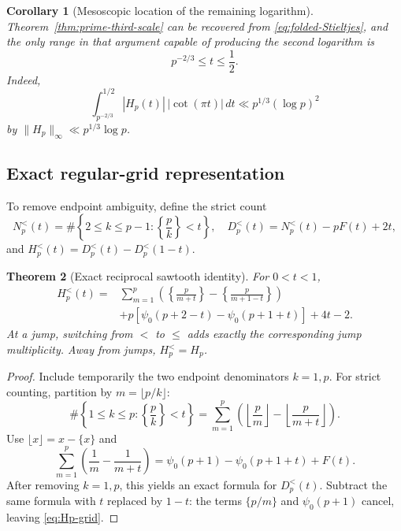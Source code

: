\documentclass[11pt]{amsart}
\numberwithin{equation}{section}
\newtheorem{theorem}{Theorem}[section]
\newtheorem{corollary}[theorem]{Corollary}
\theoremstyle{definition}
\theoremstyle{remark}
\begin{document}
\begin{corollary}[Mesoscopic location of the remaining logarithm]\label{cor:mesoscopic-log}
Theorem~\ref{thm:prime-third-scale} can be recovered from
\eqref{eq:folded-Stieltjes}, and the only range in that argument capable of
producing the second logarithm is
\begin{equation}\label{eq:mesoscopic-range}
 p^{-2/3}\le t\le\frac12.
\end{equation}
Indeed,
\begin{equation}\label{eq:mesoscopic-current-bound}
 \int_{p^{-2/3}}^{1/2}|H_p(t)|\,|\cot(\pi t)|\,dt
 \ll p^{1/3}(\log p)^2
\end{equation}
by \(\|H_p\|_\infty\ll p^{1/3}\log p\).
\end{corollary}

\subsection{Exact regular-grid representation}

To remove endpoint ambiguity, define the strict count
\begin{equation}\label{eq:N-strict}
 N_p^{<}(t)=\#\left\{2\le k\le p-1:\left\{\frac pk\right\}<t\right\},
 \quad
 D_p^{<}(t)=N_p^{<}(t)-pF(t)+2t,
\end{equation}
and \(H_p^{<}(t)=D_p^{<}(t)-D_p^{<}(1-t)\).

\begin{theorem}[Exact reciprocal sawtooth identity]\label{thm:Hp-grid}
For \(0<t<1\),
\begin{equation}\label{eq:Hp-grid}
\begin{aligned}
 H_p^{<}(t)
={}&\sum_{m=1}^{p}
 \left(\left\{\frac{p}{m+t}\right\}
       -\left\{\frac{p}{m+1-t}\right\}\right)\\
&+p\left[\psi_0(p+2-t)-\psi_0(p+1+t)\right]+4t-2.
\end{aligned}
\end{equation}
At a jump, switching from \(<\) to \(\le\) adds exactly the corresponding
jump multiplicity.  Away from jumps, \(H_p^{<}=H_p\).
\end{theorem}

\begin{proof}
Include temporarily the two endpoint denominators \(k=1,p\).  For strict
counting, partition by \(m=\lfloor p/k\rfloor\):
\[
 \#\left\{1\le k\le p:\left\{\frac pk\right\}<t\right\}
 =\sum_{m=1}^{p}
 \left(\left\lfloor\frac pm\right\rfloor
       -\left\lfloor\frac{p}{m+t}\right\rfloor\right).
\]
Use \(\lfloor x\rfloor=x-\{x\}\) and
\[
 \sum_{m=1}^{p}\left(\frac1m-\frac1{m+t}\right)
 =\psi_0(p+1)-\psi_0(p+1+t)+F(t).
\]
After removing \(k=1,p\), this yields an exact formula for
\(D_p^{<}(t)\).  Subtract the same formula with \(t\) replaced by \(1-t\):
the terms \(\{p/m\}\) and \(\psi_0(p+1)\) cancel, leaving
\eqref{eq:Hp-grid}.
\end{proof}
\end{document}

